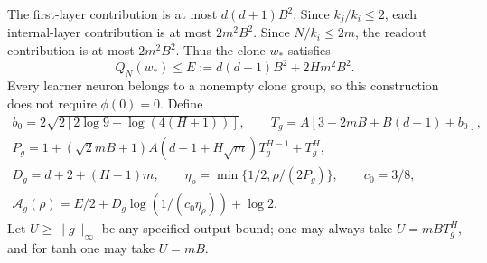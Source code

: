 The first-layer contribution is at most $d(d+1)B^2$.
Since $k_j/k_i\leq2$, each internal-layer contribution is at most
$2m^2B^2$. Since $N/k_i\leq2m$, the readout contribution is at most
$2m^2B^2$. Thus the clone $w_*$ satisfies
\[
 Q_N(w_*)\leq E:=d(d+1)B^2+2Hm^2B^2.
\]
Every learner neuron belongs to a nonempty clone group, so this
construction does not require $\phi(0)=0$.
Define
\begin{gather*}
 b_0=2\sqrt{2[2\log9+\log(4(H+1))]},\qquad
 T_g=A[3+2mB+B(d+1)+b_0],\\
 P_g=1+(\sqrt2mB+1)A(d+1+H\sqrt m)T_g^{H-1}+T_g^H,\\
 D_g=d+2+(H-1)m,\qquad
 \eta_\rho=\min\{1/2,\rho/(2P_g)\},\qquad c_0=3/8,\\
 \mathcal A_g(\rho)=E/2+D_g\log(1/(c_0\eta_\rho))+\log2.
\end{gather*}
Let $U\geq\|g\|_\infty$ be any specified output bound;
one may always take $U=mBT_g^H$, and for tanh one may take $U=mB$.

